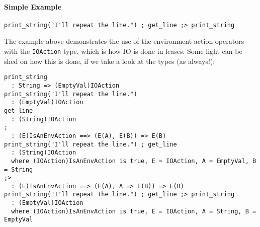 \documentclass{article}
\begin{document}
\paragraph{Simple Example}
\begin{verbatim}
print_string("I'll repeat the line.") ; get_line ;> print_string
\end{verbatim}
The example above demonstrates the use of the environment action operators with
the \texttt{IOAction} type, which is how IO is done in lcases. Some light can
be shed on how this is done, if we take a look at the types (as always!):
\begin{verbatim}
print_string
  : String => (EmptyVal)IOAction
print_string("I'll repeat the line.")
  : (EmptyVal)IOAction
get_line
  : (String)IOAction
; 
  : (E)IsAnEnvAction ==> (E(A), E(B)) => E(B) 
print_string("I'll repeat the line.") ; get_line
  : (String)IOAction
  where (IOAction)IsAnEnvAction is true, E = IOAction, A = EmptyVal, B = String
;>
  : (E)IsAnEnvAction ==> (E(A), A => E(B)) => E(B) 
print_string("I'll repeat the line.") ; get_line ;> print_string
  : (EmptyVal)IOAction
  where (IOAction)IsAnEnvAction is true, E = IOAction, A = String, B = EmptyVal
\end{verbatim}
\end{document}
